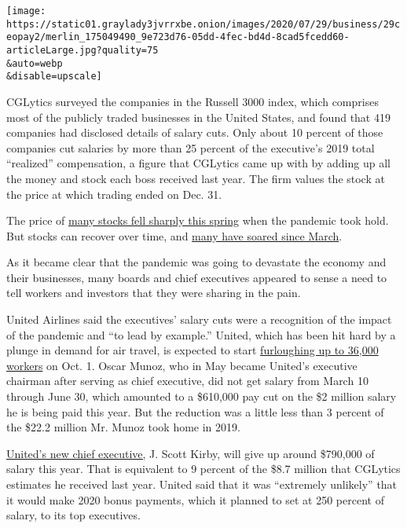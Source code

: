 \texttt{[image: https://static01.graylady3jvrrxbe.onion/images/2020/07/29/business/29ceopay2/merlin\_175049490\_9e723d76-05dd-4fec-bd4d-8cad5fcedd60-articleLarge.jpg?quality=75\\\&auto=webp\\\&disable=upscale]}

CGLytics surveyed the companies in the Russell 3000 index, which
comprises most of the publicly traded businesses in the United States,
and found that 419 companies had disclosed details of salary cuts. Only
about 10 percent of those companies cut salaries by more than 25 percent
of the executive's 2019 total ``realized'' compensation, a figure that
CGLytics came up with by adding up all the money and stock each boss
received last year. The firm values the stock at the price at which
trading ended on Dec. 31.

The price of
\href{https://www.nytimes3xbfgragh.onion/2020/03/20/business/coronavirus-trump-stock-market.html}{many
stocks fell sharply this spring} when the pandemic took hold. But stocks
can recover over time, and
\href{https://www.nytimes3xbfgragh.onion/2020/06/08/business/recession-stock-market-coronavirus.html}{many
have soared since March}.

As it became clear that the pandemic was going to devastate the economy
and their businesses, many boards and chief executives appeared to sense
a need to tell workers and investors that they were sharing in the pain.

United Airlines said the executives' salary cuts were a recognition of
the impact of the pandemic and ``to lead by example.'' United, which has
been hit hard by a plunge in demand for air travel, is expected to start
\href{https://www.nytimes3xbfgragh.onion/2020/07/08/business/united-airlines-furlough-36000.html}{furloughing
up to 36,000 workers} on Oct. 1. Oscar Munoz, who in May became United's
executive chairman after serving as chief executive, did not get salary
from March 10 through June 30, which amounted to a \$610,000 pay cut on
the \$2 million salary he is being paid this year. But the reduction was
a little less than 3 percent of the \$22.2 million Mr. Munoz took home
in 2019.

\href{https://www.nytimes3xbfgragh.onion/2019/12/05/business/united-ceo-oscar-munoz.html}{United's
new chief executive,} J. Scott Kirby, will give up around \$790,000 of
salary this year. That is equivalent to 9 percent of the \$8.7 million
that CGLytics estimates he received last year. United said that it was
``extremely unlikely'' that it would make 2020 bonus payments, which it
planned to set at 250 percent of salary, to its top executives.

